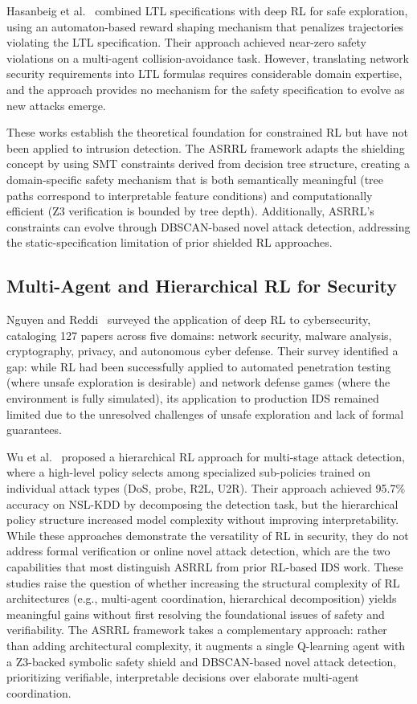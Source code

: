 \documentclass[12pt, letterpaper, oneside]{report}
\newcommand{\ASRRL}{\textsc{ASRRL}}
\begin{document}
Hasanbeig et al.~\cite{hasanbeig2020} combined LTL specifications with deep RL for safe exploration, using an automaton-based reward shaping mechanism that penalizes trajectories violating the LTL specification. Their approach achieved near-zero safety violations on a multi-agent collision-avoidance task. However, translating network security requirements into LTL formulas requires considerable domain expertise, and the approach provides no mechanism for the safety specification to evolve as new attacks emerge.

These works establish the theoretical foundation for constrained RL but have not been applied to intrusion detection. The \ASRRL{} framework adapts the shielding concept by using SMT constraints derived from decision tree structure, creating a domain-specific safety mechanism that is both semantically meaningful (tree paths correspond to interpretable feature conditions) and computationally efficient (Z3 verification is bounded by tree depth). Additionally, \ASRRL{}'s constraints can evolve through DBSCAN-based novel attack detection, addressing the static-specification limitation of prior shielded RL approaches.

\subsection{Multi-Agent and Hierarchical RL for Security}

Nguyen and Reddi~\cite{nguyen2021} surveyed the application of deep RL to cybersecurity, cataloging 127 papers across five domains: network security, malware analysis, cryptography, privacy, and autonomous cyber defense. Their survey identified a gap: while RL had been successfully applied to automated penetration testing (where unsafe exploration is desirable) and network defense games (where the environment is fully simulated), its application to production IDS remained limited due to the unresolved challenges of unsafe exploration and lack of formal guarantees.

Wu et al.~\cite{wu2022} proposed a hierarchical RL approach for multi-stage attack detection, where a high-level policy selects among specialized sub-policies trained on individual attack types (DoS, probe, R2L, U2R). Their approach achieved 95.7\% accuracy on NSL-KDD by decomposing the detection task, but the hierarchical policy structure increased model complexity without improving interpretability. While these approaches demonstrate the versatility of RL in security, they do not address formal verification or online novel attack detection, which are the two capabilities that most distinguish \ASRRL{} from prior RL-based IDS work. These studies raise the question of whether increasing the structural complexity of RL architectures (e.g., multi-agent coordination, hierarchical decomposition) yields meaningful gains without first resolving the foundational issues of safety and verifiability. The \ASRRL{} framework takes a complementary approach: rather than adding architectural complexity, it augments a single Q-learning agent with a Z3-backed symbolic safety shield and DBSCAN-based novel attack detection, prioritizing verifiable, interpretable decisions over elaborate multi-agent coordination.
\end{document}
